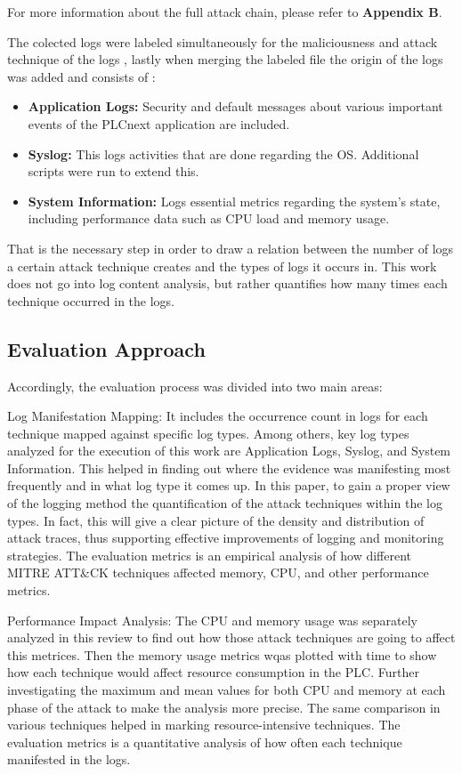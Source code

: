 \documentclass[Master,BMR,english]{twbook}
\begin{document}
For more information about the full attack chain, please refer to \textbf{Appendix B}.

The colected logs were labeled  simultaneously for the maliciousness and attack technique of the logs , lastly when merging the labeled file the origin of the logs was added and consists of :  

\begin{itemize}
    \item \textbf{Application Logs:} Security and default messages about various important events of the PLCnext application are included. 
    \item \textbf{Syslog:} This logs activities that are done regarding the OS. Additional scripts were run to extend this. 
    \item \textbf{System Information:} Logs essential metrics regarding the system’s state, including performance data such as CPU load and memory usage.
\end{itemize}

That is the necessary step in order to draw a relation between the number of logs a certain attack technique creates and the types of logs it occurs in. This work does not go into log content analysis, but rather quantifies how many times each technique occurred in the logs.


\subsection{Evaluation Approach}


Accordingly, the evaluation process was divided into two main areas:

Log Manifestation Mapping: It includes the occurrence count in logs for each technique mapped against specific log types. Among others, key log types analyzed for the execution of this work are Application Logs, Syslog, and System Information. This helped in finding out where the evidence was manifesting most frequently and in what log type it comes up. In this paper, to gain a proper view of the logging method the quantification of the attack techniques within the log types. In fact, this will give a clear picture of the density and distribution of attack traces, thus supporting effective improvements of logging and monitoring strategies. The evaluation metrics is an empirical analysis of how different MITRE ATT\&CK techniques affected memory, CPU, and other performance metrics. 

Performance Impact Analysis: The CPU and memory usage was separately analyzed in this review to find out how those attack techniques are going to affect this metrices. Then the memory usage metrics wqas plotted with time to show how each technique would affect resource consumption in the PLC. Further investigating the maximum and mean values for both CPU and memory at each phase of the attack to make the analysis more precise. The same comparison in various techniques helped in marking resource-intensive techniques. The evaluation metrics is a quantitative analysis of how often each technique manifested in the logs.
\end{document}
